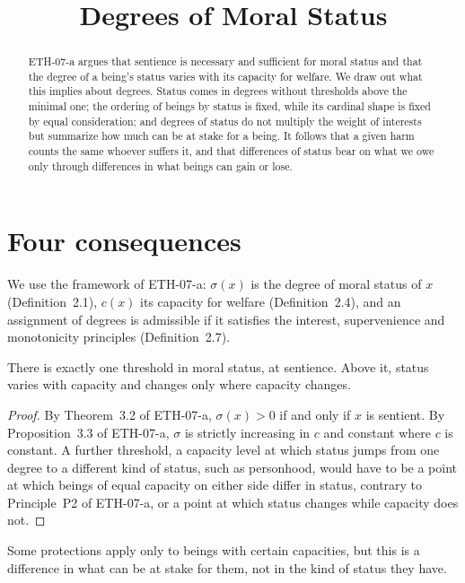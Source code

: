 \documentclass{situationist-preprint}
\title{Degrees of Moral Status}
\begin{document}
\maketitle

\begin{abstract}
ETH-07-a argues that sentience is necessary and sufficient for moral status and that the degree of a being's status varies with its capacity for welfare. We draw out what this implies about degrees. Status comes in degrees without thresholds above the minimal one; the ordering of beings by status is fixed, while its cardinal shape is fixed by equal consideration; and degrees of status do not multiply the weight of interests but summarize how much can be at stake for a being. It follows that a given harm counts the same whoever suffers it, and that differences of status bear on what we owe only through differences in what beings can gain or lose.
\end{abstract}

\section{Four consequences}

We use the framework of ETH-07-a: $\sigma(x)$ is the degree of moral status of $x$ (Definition~2.1), $c(x)$ its capacity for welfare (Definition~2.4), and an assignment of degrees is admissible if it satisfies the interest, supervenience and monotonicity principles (Definition~2.7).

\begin{proposition}\label{p:nothreshold}
There is exactly one threshold in moral status, at sentience. Above it, status varies with capacity and changes only where capacity changes.
\end{proposition}

\begin{proof}
By Theorem~3.2 of ETH-07-a, $\sigma(x) > 0$ if and only if $x$ is sentient. By Proposition~3.3 of ETH-07-a, $\sigma$ is strictly increasing in $c$ and constant where $c$ is constant. A further threshold, a capacity level at which status jumps from one degree to a different kind of status, such as personhood, would have to be a point at which beings of equal capacity on either side differ in status, contrary to Principle~P2 of ETH-07-a, or a point at which status changes while capacity does not.
\end{proof}

Some protections apply only to beings with certain capacities, but this is a difference in what can be at stake for them, not in the kind of status they have.
\end{document}
